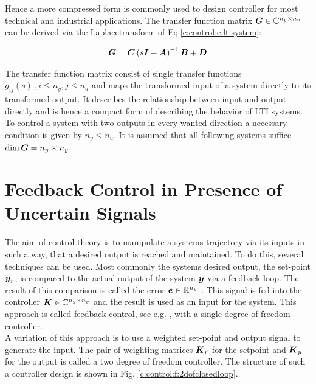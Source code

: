Hence a more compressed form is commonly used to design controller for most technical and industrial applications. The transfer function matrix \cite[p.20]{Lunze2014} $\mbox{\boldmath$G$} \in \mathbb{C}^{n_y\times n_u}$ can be derived via the Laplacetransform of Eq.\ref{c:control:e:ltisystem}:

\begin{align}
\begin{split}
\mbox{\boldmath$G$} &= \mbox{\boldmath$C$} \left(s \mbox{\boldmath$I$} - \mbox{\boldmath$A$} \right)^{-1} \mbox{\boldmath$B$} + \mbox{\boldmath$D$} \\
\end{split}
\label{c:control:e:TransferFunctionMatrix}
\end{align}

The transfer function matrix consist of single transfer functions $g_{ij}(s)~, i \leq n_y, j \leq n_u$ and maps the transformed input of a system directly to its  transformed output. It describes the relationship between input and output directly and is hence a compact form of describing the behavior of LTI systems. To control a system with two outputs in every wanted direction a necessary condition is given by $n_y \leq n_u$. It is assumed that all following systems suffice $\dim{\mbox{\boldmath$G$}} = n_y \times n_y$.  \\

\section{Feedback Control in Presence of Uncertain Signals}
\label{c:control:s:feedback}

The aim of control theory is to manipulate a systems trajectory via its inputs in such a way, that a desired output is reached and maintained. To do this, several techniques can be used. Most commonly the systems desired output, the set-point $\mbox{\boldmath$y$}_r$, is compared to the actual output of the system $\mbox{\boldmath$y$}$ via a feedback loop. The result of this comparison is called the error $\mbox{\boldmath$e$} \in \mathbb{R}^{n_y}$ . This signal is fed into the controller $\mbox{\boldmath$K$} \in \mathbb{C}^{n_y \times n_y}$  and the result is used as an input for the system. This approach is called feedback control, see e.g. \cite{Astrom2009}, with a single degree of freedom controller.\\

A variation of this approach is to use a weighted set-point and output signal to generate the input. The pair of weighting matrices $\mbox{\boldmath$K$}_r$  for the setpoint and $\mbox{\boldmath$K$}_y$ for the output is called a two degree of freedom controller. The structure of such a controller design is shown in Fig. \ref{c:control:f:2dofclosedloop}.

